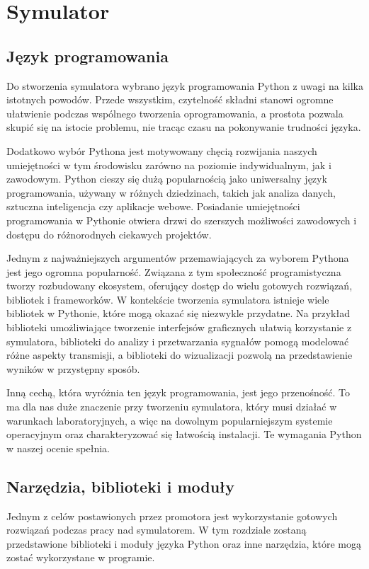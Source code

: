 \section{Symulator}
\subsection{Język programowania}

Do stworzenia symulatora wybrano język programowania Python z uwagi na kilka istotnych powodów. Przede wszystkim, czytelność składni stanowi ogromne ułatwienie podczas wspólnego tworzenia oprogramowania, a prostota pozwala skupić się na istocie problemu, nie tracąc czasu na pokonywanie trudności języka.

Dodatkowo wybór Pythona jest motywowany chęcią rozwijania naszych umiejętności w tym środowisku zarówno na poziomie indywidualnym, jak i zawodowym. Python cieszy się dużą popularnością jako uniwersalny język programowania, używany w różnych dziedzinach, takich jak analiza danych, sztuczna inteligencja czy aplikacje webowe. Posiadanie umiejętności programowania w Pythonie otwiera drzwi do szerszych możliwości zawodowych i dostępu do różnorodnych ciekawych projektów.

Jednym z najważniejszych argumentów przemawiających za wyborem Pythona jest jego ogromna popularność. Związana z tym społeczność programistyczna tworzy rozbudowany ekosystem, oferujący dostęp do wielu gotowych rozwiązań, bibliotek i frameworków. W kontekście tworzenia symulatora istnieje wiele bibliotek w Pythonie, które mogą okazać się niezwykle przydatne. Na przykład biblioteki umożliwiające tworzenie interfejsów graficznych ułatwią korzystanie z symulatora, biblioteki do analizy i przetwarzania sygnałów pomogą modelować różne aspekty transmisji, a biblioteki do wizualizacji pozwolą na przedstawienie wyników w przystępny sposób.

Inną cechą, która wyróżnia ten język programowania, jest jego przenośność. To ma dla nas duże znaczenie przy tworzeniu symulatora, który musi działać w warunkach laboratoryjnych, a więc na dowolnym popularniejszym systemie operacyjnym oraz charakteryzować się łatwością instalacji. Te wymagania Python w naszej ocenie spełnia.

\subsection{Narzędzia, biblioteki i moduły}
Jednym z celów postawionych przez promotora jest wykorzystanie gotowych rozwiązań podczas pracy nad symulatorem. W tym rozdziale zostaną przedstawione biblioteki i moduły języka Python oraz inne narzędzia, które mogą zostać wykorzystane w programie.


